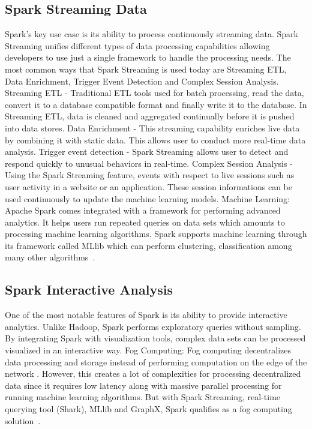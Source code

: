 \subsection{Spark Streaming Data}
Spark's key use case is its ability to process continuously 
streaming data. Spark Streaming unifies different types of data processing 
capabilities allowing developers to use just a single framework to handle the 
processing needs. The most common ways that Spark Streaming is used today are 
Streaming ETL, Data Enrichment, Trigger Event Detection and Complex Session 
Analysis. Streaming ETL - Traditional ETL tools used for batch processing, read 
the data, convert it to a database compatible format and finally write it to the
database. In Streaming ETL, data is cleaned and aggregated continually before it 
is pushed into data stores. Data Enrichment - This streaming capability enriches 
live data by combining it with static data. This allows user to conduct more 
real-time data analysis. Trigger event detection - Spark Streaming allows user 
to detect and respond quickly to unusual behaviors in real-time. Complex Session
Analysis - Using the Spark Streaming feature, events with respect to live 
sessions such as user activity in a website or an application. These session 
informations can be used continuously to update the machine learning models. 
Machine Learning: Apache Spark comes integrated with a framework for performing 
advanced analytics. It helps users run repeated queries on data sets which 
amounts to processing machine learning algorithms. Spark supports machine 
learning through its framework called MLlib which can perform clustering, 
classification among many other algorithms~\cite{hid-sp18-408-Spark-Use-Case}. 


\subsection{Spark Interactive Analysis}
One of the most notable features of Spark is its ability 
to provide interactive analytics. Unlike Hadoop, Spark performs exploratory 
queries without sampling. By integrating Spark with visualization tools, complex
data sets can be processed visualized in an interactive way.
Fog Computing: Fog computing decentralizes data processing and storage instead 
of performing computation on the edge of the network . However, this creates a 
lot of complexities for processing decentralized data since it requires low 
latency along with massive parallel processing for running machine learning 
algorithms.  But with Spark Streaming, real-time querying tool (Shark), MLlib 
and GraphX, Spark qualifies as a fog computing solution~\cite{hid-sp18-408-Spark-Use-Case}.


